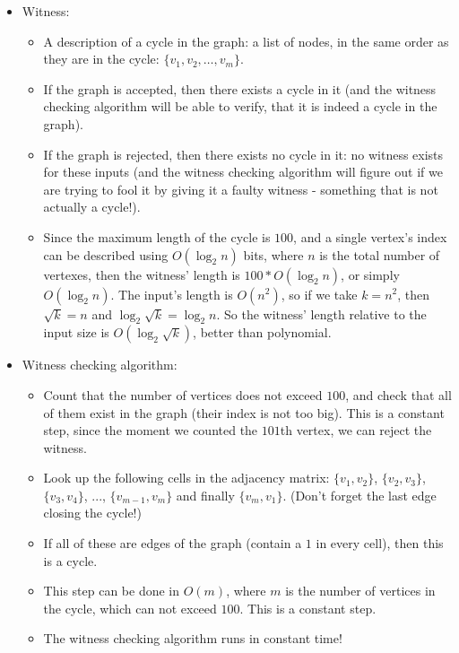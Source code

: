 \begin{itemize}
    \item Witness:
        \begin{itemize}
            \item A description of a cycle in the graph: a list of nodes, in the same order as they are in the cycle: $\{v_1,v_2,\dots,v_m\}$.
            \item If the graph is accepted, then there exists a cycle in it (and the witness checking algorithm will be able to verify, that it is indeed a cycle in the graph).
            \item If the graph is rejected, then there exists no cycle in it: no witness exists for these inputs (and the witness checking algorithm will figure out if we are trying to fool it by giving it a faulty witness - something that is not actually a cycle!).
            \item Since the maximum length of the cycle is $100$, and a single vertex's index can be described using $O(\log_{2}n)$ bits, where $n$ is the total number of vertexes, then the witness' length is $100*O(\log_{2}n)$, or simply $O(\log_{2}n)$. The input's length is $O(n^2)$, so if we take $k=n^2$, then $\sqrt{k} = n$ and $\log_{2}\sqrt{k} = \log_{2}n$. So the witness' length relative to the input size is $O(\log_{2}\sqrt{k})$, better than polynomial.
        \end{itemize}
    \item Witness checking algorithm:
        \begin{itemize}
            \item Count that the number of vertices does not exceed $100$, and check that all of them exist in the graph (their index is not too big). This is a constant step, since the moment we counted the $101$th vertex, we can reject the witness.
            \item Look up the following cells in the adjacency matrix: $\{v_1,v_2\}$, $\{v_2,v_3\}$, $\{v_3,v_4\}$, ..., $\{v_{m-1},v_{m}\}$ and finally $\{v_m,v_1\}$. (Don't forget the last edge closing the cycle!)
            \item If all of these are edges of the graph (contain a $1$ in every cell), then this is a cycle.
            \item This step can be done in $O(m)$, where $m$ is the number of vertices in the cycle, which can not exceed $100$. This is a constant step.
            \item The witness checking algorithm runs in constant time!
        \end{itemize}
\end{itemize}

